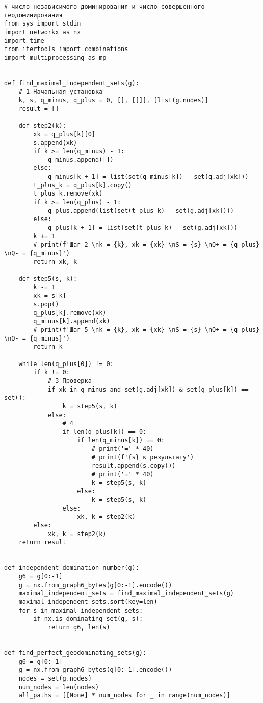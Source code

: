 \documentclass[bachelor, och, nir]{SCWorks}
\begin{document}
    \begin{verbatim}
# число независимого доминирования и число совершенного геодоминирования
from sys import stdin
import networkx as nx
import time
from itertools import combinations
import multiprocessing as mp


def find_maximal_independent_sets(g):
    # 1 Начальная установка
    k, s, q_minus, q_plus = 0, [], [[]], [list(g.nodes)]
    result = []

    def step2(k):
        xk = q_plus[k][0]
        s.append(xk)
        if k >= len(q_minus) - 1:
            q_minus.append([])
        else:
            q_minus[k + 1] = list(set(q_minus[k]) - set(g.adj[xk]))
        t_plus_k = q_plus[k].copy()
        t_plus_k.remove(xk)
        if k >= len(q_plus) - 1:
            q_plus.append(list(set(t_plus_k) - set(g.adj[xk])))
        else:
            q_plus[k + 1] = list(set(t_plus_k) - set(g.adj[xk]))
        k += 1
        # print(f'Шаг 2 \nk = {k}, xk = {xk} \nS = {s} \nQ+ = {q_plus} \nQ- = {q_minus}')
        return xk, k

    def step5(s, k):
        k -= 1
        xk = s[k]
        s.pop()
        q_plus[k].remove(xk)
        q_minus[k].append(xk)
        # print(f'Шаг 5 \nk = {k}, xk = {xk} \nS = {s} \nQ+ = {q_plus} \nQ- = {q_minus}')
        return k

    while len(q_plus[0]) != 0:
        if k != 0:
            # 3 Проверка
            if xk in q_minus and set(g.adj[xk]) & set(q_plus[k]) == set():
                k = step5(s, k)
            else:
                # 4
                if len(q_plus[k]) == 0:
                    if len(q_minus[k]) == 0:
                        # print('=' * 40)
                        # print(f'{s} к результату')
                        result.append(s.copy())
                        # print('=' * 40)
                        k = step5(s, k)
                    else:
                        k = step5(s, k)
                else:
                    xk, k = step2(k)
        else:
            xk, k = step2(k)
    return result


def independent_domination_number(g):
    g6 = g[0:-1]
    g = nx.from_graph6_bytes(g[0:-1].encode())
    maximal_independent_sets = find_maximal_independent_sets(g)
    maximal_independent_sets.sort(key=len)
    for s in maximal_independent_sets:
        if nx.is_dominating_set(g, s):
            return g6, len(s)


def find_perfect_geodominating_sets(g):
    g6 = g[0:-1]
    g = nx.from_graph6_bytes(g[0:-1].encode())
    nodes = set(g.nodes)
    num_nodes = len(nodes)
    all_paths = [[None] * num_nodes for _ in range(num_nodes)]


\end{verbatim}
\end{document}
